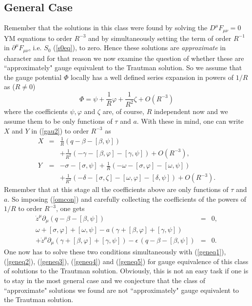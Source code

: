 \documentclass[a4paper,twocolumn,prd,showpacs,amsmath,amssymb]{revtex4}
\begin{document}
\subsection{\label{ggensol} General Case}

Remember that the solutions in this class were found by solving the
$D^{\mu} F_{\mu\nu}=0$ YM equations to order $R^{-3}$ and by simultaneously
setting the term of order $R^{-1}$ in $\partial^{\mu} F_{\mu\nu}$, i.e. $S_{0}$
(\ref{s0eq}), to zero. Hence these solutions are {\it approximate} in character and
for that reason we now examine the question of whether these are
``approximately" gauge equivalent to the Trautman solution. So we assume
that the gauge potential $\Phi$ locally has a well defined series expansion
in powers of $1/R$ as ($R \neq 0$)
\[ \Phi = \psi + \frac{1}{R} \varphi + \frac{1}{R^2} \zeta + O(R^{-3}) \]
where the coefficients $\psi, \varphi$ and $\zeta$ are, of course, $R$
independent now and we assume them to be only functions of $\tau$ and $a$.
With these in mind, one can write $X$ and $Y$ in (\ref{gau2}) to order $R^{-3}$
as
\begin{eqnarray*}
X & = & \frac{1}{R} (q-\beta-[\beta,\psi]) \\
& & + \frac{1}{R^2} (-\gamma -[\beta,\varphi] -[\gamma,\psi]) + O(R^{-3}) , \\
Y & = & -\sigma - [\sigma,\psi] + \frac{1}{R} (-\omega -[\sigma,\varphi]-[\omega,\psi]) \\
& & + \frac{1}{R^2} (-\delta-[\sigma,\zeta]-[\omega,\varphi]-[\delta,\psi]) + O(R^{-3}) .
\end{eqnarray*}
Remember that at this stage all the coefficients above are only functions of $\tau$
and $a$. So imposing (\ref{omcon}) and carefully collecting the coefficients of
the powers of $1/R$ to order $R^{-3}$, one gets
\begin{eqnarray*}
\dot{z}^{\mu} \partial_{\mu} (q-\beta-[\beta,\psi]) & = & 0 , \\
\omega + [\sigma,\varphi] + [\omega,\psi]
- a (\gamma + [\beta,\varphi] + [\gamma,\psi]) & & \\
+ \dot{z}^{\mu} \partial_{\mu} (\gamma + [\beta,\varphi] + [\gamma,\psi])
- \epsilon \, (q-\beta-[\beta,\psi]) & = & 0 .
\end{eqnarray*}
One now has to solve these two conditions simultaneously with (\ref{geneq1}),
(\ref{geneq2}), (\ref{geneq3}), (\ref{geneq4}) and (\ref{geneq5}) for gauge
equivalence of this class of solutions to the Trautman solution. Obviously,
this is not an easy task if one is to stay in the most general case and
we conjecture that the class of ``approximate" solutions we found are not
``approximately" gauge equivalent to the Trautman solution.
\end{document}
